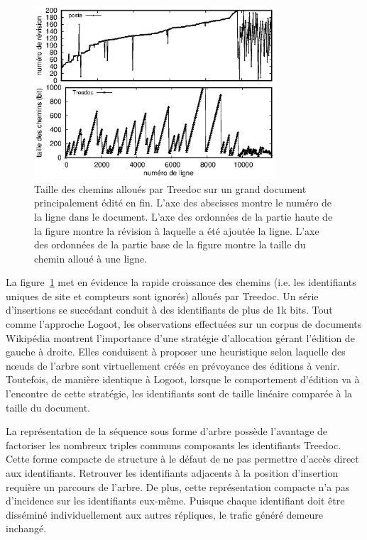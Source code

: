 \begin{figure}
  \begin{center}
    \includegraphics[width=0.8\textwidth]{img/lseq/motivationtreedoc.eps}
    \caption[Taille des chemins alloués par Treedoc sur un grand document édité
    en fin]{\label{repl:img:motivationtreedoc} Taille des chemins alloués par
      Treedoc sur un grand document principalement édité en fin. L'axe des
      abscisses montre le numéro de la ligne dans le document. L'axe des
      ordonnées de la partie haute de la figure montre la révision à laquelle a
      été ajoutée la ligne. L'axe des ordonnées de la partie base de la figure
      montre la taille du chemin alloué à une ligne.}
  \end{center}
\end{figure}


\noindent La figure~\ref{repl:img:motivationtreedoc} met en évidence la rapide
croissance des chemins (i.e. les identifiants uniques de site et compteurs sont
ignorés) alloués par Treedoc. Un série d'insertions se succédant conduit à des
identifiants de plus de 1k bits. Tout comme l'approche Logoot, les observations
effectuées sur un corpus de documents Wikipédia montrent l'importance d'une
stratégie d'allocation gérant l'édition de gauche à droite. Elles conduisent à
proposer une heuristique selon laquelle des nœuds de l'arbre sont virtuellement
créés en prévoyance des éditions à venir. Toutefois, de manière identique à
Logoot, lorsque le comportement d'édition va à l'encontre de cette stratégie,
les identifiants sont de taille linéaire comparée à la taille du document.


\noindent La représentation de la séquence sous forme d'arbre possède l'avantage
de factoriser les nombreux triples communs composants les identifiants
Treedoc. Cette forme compacte de structure à le défaut de ne pas permettre
d'accès direct aux identifiants. Retrouver les identifiants adjacents à la
position d'insertion requière un parcours de l'arbre. De plus, cette
représentation compacte n'a pas d'incidence sur les identifiants
eux-même. Puisque chaque identifiant doit être disséminé individuellement aux
autres répliques, le trafic généré demeure inchangé.

